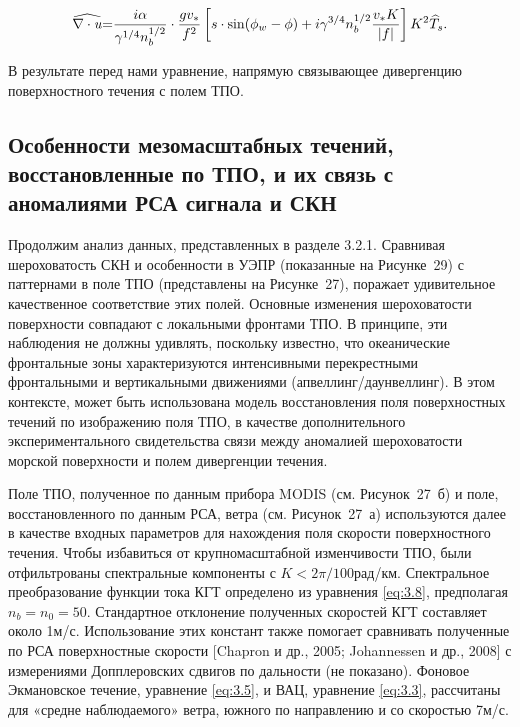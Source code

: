\begin{equation} \label{eq:3.10} \widehat{\nabla \cdot {\it u}}{\rm =}\frac{i\alpha }{\gamma ^{1/4} n_{b}^{1/2} } \cdot \frac{gv_{*} }{f^{2} } \left[s\cdot \sin (\phi _{w} -\phi )+i\gamma ^{3/4} n_{b}^{1/2} \frac{v_{*} K}{\left|f\right|} \right]K^{2} \widehat{T}_{s} .  \end{equation} 



В результате перед нами уравнение, напрямую связывающее дивергенцию поверхностного течения с полем ТПО.



\subsection{Особенности мезомасштабных течений, восстановленные по ТПО, и их связь с аномалиями РСА сигнала и СКН} \label{sec:3.2.3}
 

Продолжим анализ данных, представленных в разделе 3.2.1. Сравнивая шероховатость СКН и особенности в УЭПР (показанные на Рисунке~29) с паттернами в поле ТПО (представлены на Рисунке~27), поражает удивительное качественное соответствие этих полей. Основные изменения шероховатости поверхности совпадают с локальными фронтами ТПО. В принципе, эти наблюдения не должны удивлять, поскольку известно, что океанические фронтальные зоны характеризуются интенсивными перекрестными фронтальными и вертикальными движениями (апвеллинг/даунвеллинг). В этом контексте, может быть использована модель восстановления поля поверхностных течений по изображению поля ТПО, в качестве дополнительного экспериментального свидетельства связи между аномалией шероховатости морской поверхности и полем дивергенции течения.

Поле ТПО, полученное по данным прибора MODIS (см. Рисунок~27~б) и поле, восстановленного по данным РСА, ветра (см. Рисунок~27~а) используются далее в качестве входных параметров для нахождения поля скорости поверхностного течения. Чтобы избавиться от крупномасштабной изменчивости ТПО, были отфильтрованы спектральные компоненты с $K<2\pi /100$рад/км. Спектральное преобразование функции тока КГТ определено из уравнения \eqref{eq:3.8}, предполагая $n_{b} =n_{0} =50$. Стандартное отклонение полученных скоростей КГТ составляет около 1м/с. Использование этих констант также помогает сравнивать полученные по РСА поверхностные скорости [Chapron и др., 2005; Johannessen и др., 2008] с измерениями Допплеровских сдвигов по дальности (не показано). Фоновое Экмановское течение, уравнение \eqref{eq:3.5}, и ВАЦ, уравнение \eqref{eq:3.3}, рассчитаны для «средне наблюдаемого» ветра, южного по направлению и со скоростью 7м/с.

